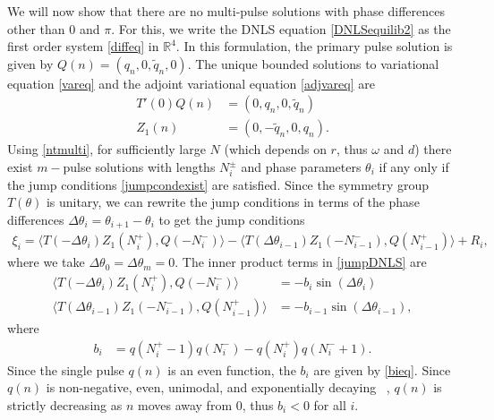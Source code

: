 \documentclass[12pt]{elsarticle}
\def\R{{\mathbb R}}
\begin{document}
We will now show that there are no multi-pulse solutions with phase differences other than $0$ and $\pi$. For this, we write the DNLS equation \cref{DNLSequilib2} as the first order system \cref{diffeq} in $\R^4$. In this formulation, the primary pulse solution is given by $Q(n) = (q_n, 0, \tilde{q}_n, 0)$. The unique bounded solutions to variational equation \cref{vareq} and the adjoint variational equation \cref{adjvareq} are
\begin{align*}
T'(0) Q(n) &= (0, q_n, 0, \tilde{q}_n) \\
Z_1(n) &= (0, -\tilde{q}_n, 0, q_n).
\end{align*}
Using \cref{ntmulti}, for sufficiently large $N$ (which depends on $r$, thus $\omega$ and $d$) there exist $m-$pulse solutions with lengths $N_i^\pm$ and phase parameters $\theta_i$ if any only if the jump conditions \cref{jumpcondexist} are satisfied. Since the symmetry group $T(\theta)$ is unitary, we can rewrite the jump conditions in terms of the phase differences $\Delta \theta_i = \theta_{i+1} - \theta_i$ to get the jump conditions
\begin{align}\label{jumpDNLS}
\xi_i = \langle T(-\Delta \theta_i) Z_1(N_i^+), Q(-N_i^-) \rangle
- \langle T(\Delta \theta_{i-1}) Z_1(-N_{i-1}^-), Q(N_{i-1}^+) \rangle + R_i,
\end{align}
where we take $\Delta \theta_0 = \Delta \theta_m = 0$. The inner product terms in \cref{jumpDNLS} are
\begin{equation}\label{jumpIPs}
\begin{aligned}
\langle T(-\Delta\theta_i) Z_1(N_i^+), Q(-N_i^-) \rangle 
&= -b_i \sin(\Delta\theta_i) \\
\langle T(\Delta\theta_{i-1}) Z_1(-N_{i-1}^-), Q(N_{i-1}^+) \rangle &= -b_{i-1} \sin(\Delta\theta_{i-1}),
\end{aligned}
\end{equation}
where 
\begin{align*}
b_i &= q(N_i^+ - 1)q(N_i^-) - q(N_i^+)q(N_i^- + 1).
\end{align*}
Since the single pulse $q(n)$ is an even function, the $b_i$ are given by \cref{bieq}. Since $q(n)$ is non-negative, even, unimodal, and exponentially decaying ~\cite[Theorem 1]{herrmann_2011}, $q(n)$ is strictly decreasing as $n$ moves away from 0, thus $b_i < 0$ for all $i$. 
\end{document}
